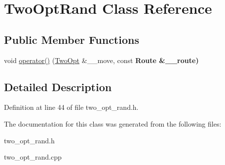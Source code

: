 \hypertarget{classTwoOptRand}{
\section{Two\-Opt\-Rand Class Reference}
\label{classTwoOptRand}
}
\subsection*{Public Member Functions}
\begin{CompactItemize}
\item 
\hypertarget{classTwoOptRand_e2f362f359517c027f6f22fba0aab375}{
void \hyperlink{classTwoOptRand_e2f362f359517c027f6f22fba0aab375}{operator()} (\hyperlink{classTwoOpt}{Two\-Opt} \&\_\-\_\-move, const \bf{Route} \&\_\-\_\-route)}
\label{classTwoOptRand_e2f362f359517c027f6f22fba0aab375}

\end{CompactItemize}


\subsection{Detailed Description}




Definition at line 44 of file two\_\-opt\_\-rand.h.

The documentation for this class was generated from the following files:\begin{CompactItemize}
\item 
two\_\-opt\_\-rand.h\item 
two\_\-opt\_\-rand.cpp\end{CompactItemize}
